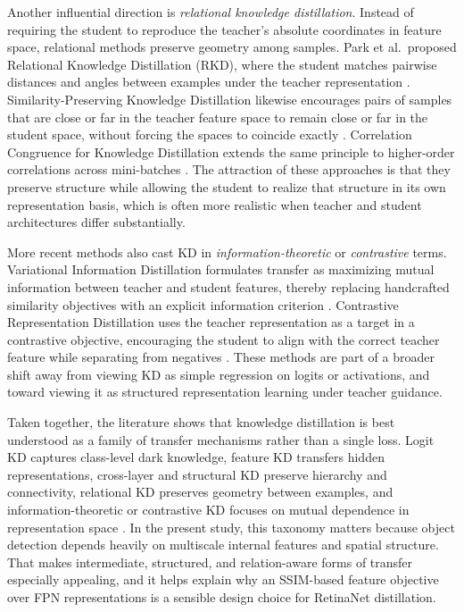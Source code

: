 Another influential direction is \emph{relational knowledge distillation}. Instead of requiring the student to reproduce the teacher's absolute coordinates in feature space, relational methods preserve geometry among samples. Park et al.\ proposed Relational Knowledge Distillation (RKD), where the student matches pairwise distances and angles between examples under the teacher representation \cite{park2019rkd}. Similarity-Preserving Knowledge Distillation likewise encourages pairs of samples that are close or far in the teacher feature space to remain close or far in the student space, without forcing the spaces to coincide exactly \cite{tung2019spkd}. Correlation Congruence for Knowledge Distillation extends the same principle to higher-order correlations across mini-batches \cite{peng2019cckd}. The attraction of these approaches is that they preserve structure while allowing the student to realize that structure in its own representation basis, which is often more realistic when teacher and student architectures differ substantially.

More recent methods also cast KD in \emph{information-theoretic} or \emph{contrastive} terms. Variational Information Distillation formulates transfer as maximizing mutual information between teacher and student features, thereby replacing handcrafted similarity objectives with an explicit information criterion \cite{ahn2019vid}. Contrastive Representation Distillation uses the teacher representation as a target in a contrastive objective, encouraging the student to align with the correct teacher feature while separating from negatives \cite{tian2020crd}. These methods are part of a broader shift away from viewing KD as simple regression on logits or activations, and toward viewing it as structured representation learning under teacher guidance.

Taken together, the literature shows that knowledge distillation is best understood as a family of transfer mechanisms rather than a single loss. Logit KD captures class-level dark knowledge, feature KD transfers hidden representations, cross-layer and structural KD preserve hierarchy and connectivity, relational KD preserves geometry between examples, and information-theoretic or contrastive KD focuses on mutual dependence in representation space \cite{gou2021survey}. In the present study, this taxonomy matters because object detection depends heavily on multiscale internal features and spatial structure. That makes intermediate, structured, and relation-aware forms of transfer especially appealing, and it helps explain why an SSIM-based feature objective over FPN representations is a sensible design choice for RetinaNet distillation.

